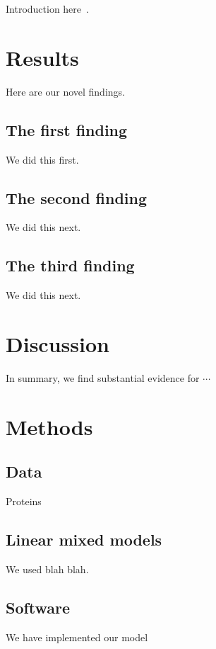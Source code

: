 \documentclass[12pt]{biorxiv}
\begin{document}
\begin{spacing}{2}
Introduction here~\cite{Keele2020}.


\section*{Results}

Here are our novel findings.

\subsection*{The first finding}

We did this first.


\subsection*{The second finding}

We did this next.


\subsection*{The third finding}

We did this next.



\section*{Discussion}

In summary, we find substantial evidence for $\cdots$



\section*{Methods}

\subsection*{Data}

Proteins


\subsection*{Linear mixed models}

We used blah blah.


\subsection*{Software}
We have implemented our model 





\end{spacing}
\end{document}
